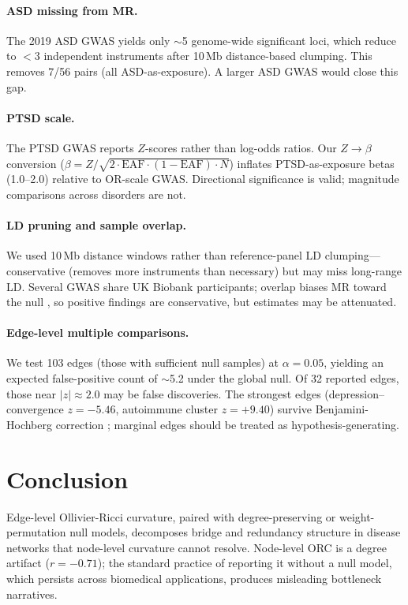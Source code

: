 \documentclass[11pt]{article}
\begin{document}
\paragraph{ASD missing from MR.} The 2019 ASD GWAS \citep{grove2019identification} yields only $\sim$5 genome-wide significant loci, which reduce to $<3$ independent instruments after 10\,Mb distance-based clumping. This removes 7/56 pairs (all ASD-as-exposure). A larger ASD GWAS would close this gap.

\paragraph{PTSD scale.} The PTSD GWAS reports $Z$-scores rather than log-odds ratios. Our $Z \to \beta$ conversion ($\beta = Z / \sqrt{2 \cdot \text{EAF} \cdot (1 - \text{EAF}) \cdot N}$) inflates PTSD-as-exposure betas (1.0--2.0) relative to OR-scale GWAS. Directional significance is valid; magnitude comparisons across disorders are not.

\paragraph{LD pruning and sample overlap.} We used 10\,Mb distance windows rather than reference-panel LD clumping---conservative (removes more instruments than necessary) but may miss long-range LD. Several GWAS share UK Biobank participants; overlap biases MR toward the null \citep{hemani2018mrbase}, so positive findings are conservative, but estimates may be attenuated.

\paragraph{Edge-level multiple comparisons.} We test 103 edges (those with sufficient null samples) at $\alpha = 0.05$, yielding an expected false-positive count of $\sim$5.2 under the global null. Of 32 reported edges, those near $|z| \approx 2.0$ may be false discoveries. The strongest edges (depression--convergence $z = -5.46$, autoimmune cluster $z = +9.40$) survive Benjamini-Hochberg correction \citep{benjamini1995controlling}; marginal edges should be treated as hypothesis-generating.

\section{Conclusion}

Edge-level Ollivier-Ricci curvature, paired with degree-preserving or weight-permutation null models, decomposes bridge and redundancy structure in disease networks that node-level curvature cannot resolve. Node-level ORC is a degree artifact ($r = -0.71$); the standard practice of reporting it without a null model, which persists across biomedical applications, produces misleading bottleneck narratives.
\end{document}
